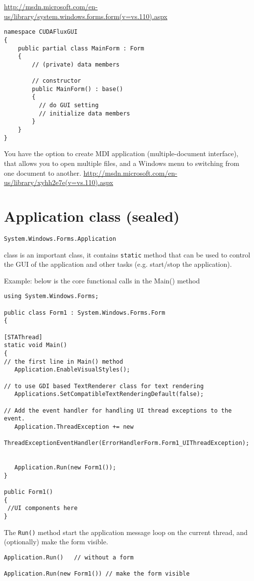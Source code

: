 \url{http://msdn.microsoft.com/en-us/library/system.windows.forms.form(v=vs.110).aspx}

\begin{verbatim}
namespace CUDAFluxGUI
{
    public partial class MainForm : Form
    {
    	// (private) data members
    	
    	// constructor
    	public MainForm() : base()
    	{
    	  // do GUI setting
    	  // initialize data members
    	}
    }
}
\end{verbatim}

You have the option to create MDI application (multiple-document interface),
that allows you to open multiple files, and a Windows menu to switching from one
document to another.
\url{http://msdn.microsoft.com/en-us/library/xyhh2e7e(v=vs.110).aspx}

\section{Application class (sealed)}
\label{sec:Winforms.Application}

\begin{verbatim}
System.Windows.Forms.Application
\end{verbatim}
class is an important class, it contains \verb!static! method that can be used
to control the GUI of the application and other tasks (e.g. start/stop the
application).

Example: below is the core functional calls in the Main() method
\begin{verbatim}
using System.Windows.Forms;

public class Form1 : System.Windows.Forms.Form
{

[STAThread]
static void Main() 
{
// the first line in Main() method
   Application.EnableVisualStyles();

// to use GDI based TextRenderer class for text rendering
   Applications.SetCompatibleTextRenderingDefault(false);

// Add the event handler for handling UI thread exceptions to the event.
   Application.ThreadException += new
      ThreadExceptionEventHandler(ErrorHandlerForm.Form1_UIThreadException);
    
    
   Application.Run(new Form1());
}

public Form1()
{
 //UI components here
}
\end{verbatim}
The \verb!Run()! method start the application message loop on the current
thread, and (optionally) make the form visible.
\begin{verbatim}
Application.Run() 	// without a form

Application.Run(new Form1()) // make the form visible
\end{verbatim}

